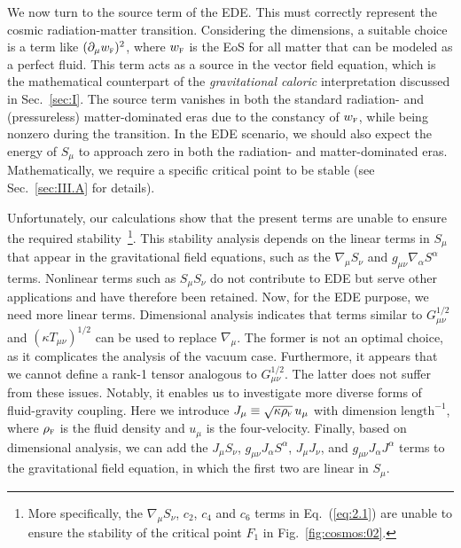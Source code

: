 \documentclass[aps,prd,twocolumn]{revtex4-2}
\newcommand\p{\partial}
\newcommand\subF{\textsc{f}}
\begin{document}
We now turn to the source term of the EDE. This must correctly represent the cosmic radiation-matter transition. Considering the dimensions, a suitable choice is a term like $(\p_\mu w_\subF)^2$, where $w_\subF$ is the EoS for all matter that can be modeled as a perfect fluid. This term acts as a source in the vector field equation, which is the mathematical counterpart of the \textit{gravitational caloric} interpretation discussed in Sec.~\ref{sec:I}. The source term vanishes in both the standard radiation- and (pressureless) matter-dominated eras due to the constancy of $w_\subF$, while being nonzero during the transition. In the EDE scenario, we should also expect the energy of $S_\mu$ to approach zero in both the radiation- and matter-dominated eras. Mathematically, we require a specific critical point to be stable (see Sec.~\ref{sec:III.A} for details).

Unfortunately, our calculations show that the present terms are unable to ensure the required stability~\footnote{More specifically, the $\nabla_\mu S_\nu$, $c_2$, $c_4$ and $c_6$ terms in Eq.~(\ref{eq:2.1}) are unable to ensure the stability of the critical point $F_1$ in Fig.~\ref{fig:cosmos:02}.}. This stability analysis depends on the linear terms in $S_\mu$ that appear in the gravitational field equations, such as the $\nabla_\mu S_\nu$ and $g_{\mu\nu}\nabla_\alpha S^\alpha$ terms. Nonlinear terms such as $S_\mu S_\nu$ do not contribute to EDE but serve other applications and have therefore been retained. Now, for the EDE purpose, we need more linear terms. Dimensional analysis indicates that terms similar to $G_{\mu\nu}^{1/2}$ and $(\kappa T_{\mu\nu})^{1/2}$ can be used to replace $\nabla_\mu$. The former is not an optimal choice, as it complicates the analysis of the vacuum case. Furthermore, it appears that we cannot define a rank-1 tensor analogous to $G_{\mu\nu}^{1/2}$. The latter does not suffer from these issues. Notably, it enables us to investigate more diverse forms of fluid-gravity coupling. Here we introduce $J_\mu\equiv\sqrt{\kappa\rho_\subF}\,u_\mu$ with dimension $\mathrm{length}^{-1}$, where $\rho_\subF$ is the fluid density and $u_\mu$ is the four-velocity. Finally, based on dimensional analysis, we can add the $J_\mu S_\nu$, $g_{\mu\nu}J_\alpha S^\alpha$, $J_\mu J_\nu$, and $g_{\mu\nu}J_\alpha J^\alpha$ terms to the gravitational field equation, in which the first two are linear in $S_\mu$.
\end{document}
